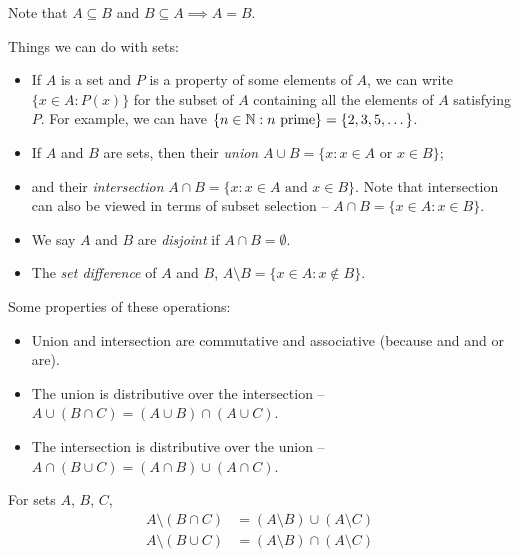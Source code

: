 \documentclass{../../template/note}
\begin{document}
    Note that \(A \subseteq B\) and \(B \subseteq A \implies A = B\).

    Things we can do with sets:

    \begin{itemize}
        \item If \(A\) is a set and \(P\) is a property of some elements of \(A\), we can write \(\{x \in A: P(x)\}\) for the subset of \(A\) containing all the elements of \(A\) satisfying \(P\). For example, we can have \(\{n \in \mathbb N: n \text{ prime}\} = \{2, 3, 5, \dots\}\).
        \item If \(A\) and \(B\) are sets, then their \emph{union} \(A \cup B = \{x : x \in A \text{ or } x \in B\}\);
        \item and their \emph{intersection} \(A \cap B = \{x : x \in A \text{ and } x \in B\}\). Note that intersection can also be viewed in terms of subset selection -- \(A \cap B = \{x \in A : x \in B\}\).
        \item We say \(A\) and \(B\) are \emph{disjoint} if \(A \cap B = \emptyset\).
        \item The \emph{set difference} of \(A\) and \(B\), \(A \setminus B = \{x \in A: x \notin B\}\).
    \end{itemize}

    Some properties of these operations:

    \begin{itemize}
        \item Union and intersection are commutative and associative (because and and or are).
        \item The union is distributive over the intersection -- \(A \cup (B \cap C) = (A \cup B) \cap (A \cup C)\).
        \item The intersection is distributive over the union -- \(A \cap (B \cup C) = (A \cap B) \cup (A \cap C)\).
    \end{itemize}


    \begin{proposition}
        For sets \(A\), \(B\), \(C\),
        \begin{align*}
            A \setminus (B \cap C) &= (A \setminus B) \cup (A \setminus C) \\
            A \setminus (B \cup C) &= (A \setminus B) \cap (A \setminus C)
        \end{align*}
    \end{proposition}
    
\end{document}
